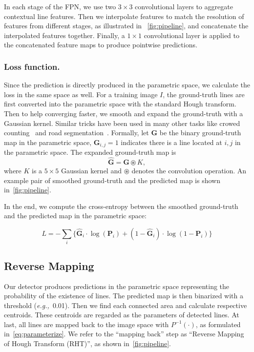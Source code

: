 \documentclass[10pt,journal,cspaper,compsoc]{IEEEtran}
\def\eg{\emph{e.g.,~}}
\begin{document}
In each stage of the FPN, 
we use two $3\times 3$ convolutional  layers
to aggregate contextual line features.
%
Then we interpolate features
to match the resolution of features from different stages, as illustrated in
~\cref{fig:pipeline},
and concatenate the interpolated features together.
%
Finally, a $1\times 1$ convolutional  layer is applied to the concatenated feature maps
to produce pointwise predictions.


\subsubsection{Loss function.}\label{sec:loss-func}
Since the prediction is directly produced in the parametric space,
we calculate the loss in the same space as well.
%
For a training image $I$, the ground-truth lines are first converted into
the parametric space with the standard Hough transform.
%
Then to help converging faster, we smooth and expand the ground-truth with a
Gaussian kernel.
%
Similar tricks have been used in many other tasks like
crowed counting~\cite{liu2019context,cheng2019learning} and road segmentation~\cite{VecRoad_20CVPR}.
%
Formally, let $\mathbf{G}$ be the binary ground-truth map in the parametric space,
$\mathbf{G}_{i,j} = 1$ indicates there is a line located at $i,j$ in the parametric space.
%
The expanded ground-truth map is
$$\hat{\mathbf{G}} = \mathbf{G}\circledast K,$$
where $K$ is a $5\times 5$ Gaussian kernel and $\circledast$ denotes the convolution operation.
%
An example pair of smoothed ground-truth and the predicted map is shown
in~\cref{fig:pipeline}.


In the end, we compute the cross-entropy between the smoothed ground-truth
and the predicted map in the parametric space:

\begin{equation}
  L = -\sum_i \Big\{ \hat{\mathbf{G}}_i\cdot\log(\mathbf{P}_i) +
                           (1-\hat{\mathbf{G}}_i)\cdot\log(1-\mathbf{P}_i)
                      \Big\}
\end{equation}


\subsection{Reverse Mapping}\label{sec:reverse}
Our detector produces predictions in the parametric space representing
the probability of the existence of lines.
%
The predicted map is then binarized with a threshold (\eg 0.01).
%
Then we find each connected area and calculate respective centroids.
%
These centroids are regarded as the parameters of detected lines.
%
At last, all lines are mapped back to the image space with
$P^{-1}(\cdot)$, as formulated in~\cref{eq:parameterize}.
%
We refer to the ``mapping back'' step as ``Reverse Mapping of Hough Transform (RHT)'',
as shown in~\cref{fig:pipeline}.
\end{document}
